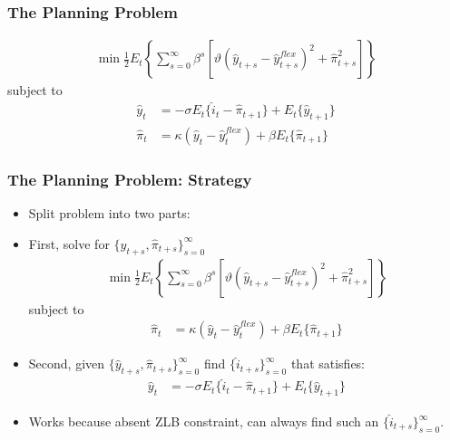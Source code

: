 \documentclass[english,xcolor=svgnames]{beamer}
\begin{document}
\begin{frame}
\frametitle{The Planning Problem}
\begin{align*}
		\min\frac{1}{2}E_t\left\{\sum_{s=0}^{\infty}\beta^s\left[\vartheta (\hat{y}_{t+s}-\hat{y}_{t+s}^{flex})^2+\hat{\pi}_{t+s}^2\right]\right\}
	\end{align*}
	subject to
	\begin{align*}
		\hat{y}_t &=-\sigma E_t\{\hat{i}_t-\hat{\pi}_{t+1}\}+E_t\{\hat{y}_{t+1}\} \\
		\hat{\pi}_t&=\kappa(\hat{y}_t-\hat{y}_t^{flex}) +\beta E_t \{\hat{\pi}_{t+1}\} 
	\end{align*}	
\end{frame}


\begin{frame}
\frametitle{The Planning Problem: Strategy}
\begin{itemize}
	\item Split problem into two parts:
	\item First, solve for $\{\hat{y}_{t+s},\hat{\pi}_{t+s}\}_{s=0}^\infty$
	\begin{align*}
		\min\frac{1}{2}E_t\left\{\sum_{s=0}^{\infty}\beta^s\left[\vartheta (\hat{y}_{t+s}-\hat{y}_{t+s}^{flex})^2+\hat{\pi}_{t+s}^2\right]\right\}
	\end{align*}
	subject to
	\begin{align*}
		\hat{\pi}_t&=\kappa(\hat{y}_t-\hat{y}_t^{flex}) +\beta E_t \{\hat{\pi}_{t+1}\} 
	\end{align*}
	\item Second, given $\{\hat{y}_{t+s},\hat{\pi}_{t+s}\}_{s=0}^\infty$ find $\{\hat{i}_{t+s}\}_{s=0}^\infty$ that satisfies:
	\begin{align*}
		\hat{y}_t &=-\sigma E_t\{\hat{i}_t-\hat{\pi}_{t+1}\}+E_t\{\hat{y}_{t+1}\} 
	\end{align*}
	\item Works because absent ZLB constraint, can always find such an $\{\hat{i}_{t+s}\}_{s=0}^\infty$.
\end{itemize}		
\end{frame}
\end{document}
